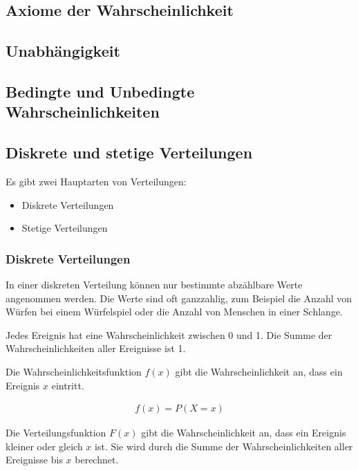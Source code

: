 \documentclass[12pt]{scrartcl}
\begin{document}
\subsection{Axiome der Wahrscheinlichkeit}
\subsection{Unabhängigkeit}
\subsection{Bedingte und Unbedingte Wahrscheinlichkeiten}

\pagebreak

\subsection{Diskrete und stetige Verteilungen}

Es gibt zwei Hauptarten von Verteilungen:
\begin{itemize}
    \item Diskrete Verteilungen
    \item Stetige Verteilungen
\end{itemize}

\subsubsection{Diskrete Verteilungen}

In einer diskreten Verteilung können nur bestimmte abzählbare Werte angenommen werden.
Die Werte sind oft ganzzahlig, zum Beispiel die Anzahl von Würfen bei einem Würfelspiel oder die Anzahl von Menschen in einer Schlange.\par

Jedes Ereignis hat eine Wahrscheinlichkeit zwischen 0 und 1.
Die Summe der Wahrscheinlichkeiten aller Ereignisse ist 1.\par

Die Wahrscheinlichkeitsfunktion $f(x)$ gibt die Wahrscheinlichkeit an, dass ein Ereignis $x$ eintritt.\par

\begin{align*}
    f(x) = P(X=x)
\end{align*}

Die Verteilungsfunktion $F(x)$ gibt die Wahrscheinlichkeit an, dass ein Ereignis kleiner oder gleich $x$ ist.
Sie wird durch die Summe der Wahrscheinlichkeiten aller Ereignisse bis $x$ berechnet.\par
\end{document}
